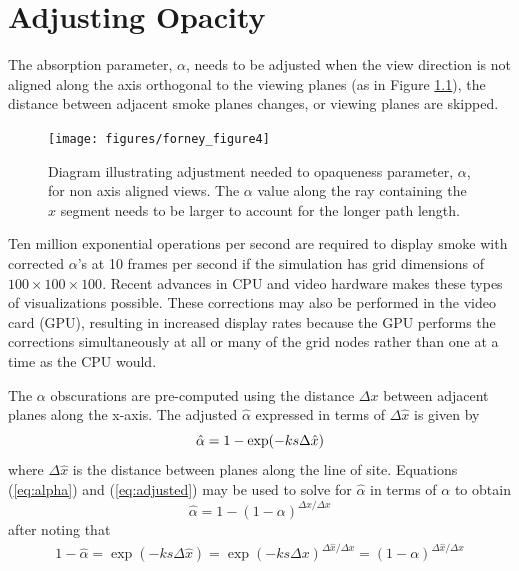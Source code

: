 \documentclass[11pt,twoside]{book}
\begin{document}
%
%

\chapter{Adjusting Opacity}

The absorption parameter, $\alpha$, needs to be adjusted when the
view direction is not aligned along the axis orthogonal to the
viewing planes (as in Figure \ref{figray}), the distance between
adjacent smoke planes changes, or viewing planes are skipped.
\begin{figure}[t]
\centerline{\texttt{[image: figures/forney\_figure4]}}
\caption [Diagram illustrating the adjustment needed to opaqueness
parameter, $\alpha$, for non axis aligned views.] { Diagram
illustrating adjustment needed to opaqueness parameter, $\alpha$,
for non axis aligned views. The $\alpha$ value along the ray
containing the $\hat{x}$ segment needs to be larger to account for
the longer path length. } \label{figray}
\end{figure}

Ten million exponential operations per second are required to
display smoke with corrected $\alpha$'s at 10 frames per second if
the simulation has grid dimensions of $100\times 100\times 100$.
Recent advances in CPU and video hardware makes these types of
visualizations possible. These corrections may also be performed
in the video card (GPU), resulting in increased display rates
because the GPU performs the corrections simultaneously at all or
many of the grid nodes rather than one at a time as the CPU would.

The $\alpha$ obscurations are pre-computed using the distance
$\Delta x$ between adjacent planes along the x-axis. The adjusted
$\hat{\alpha}$ expressed in terms of $\Delta\hat{x}$ is given by
\begin{equation}
\label{eq:adjusted}
\hat{\alpha}=1-\exp(-ks\Delta \hat{x})\\
\end{equation}
where $\Delta\hat{x}$ is the distance between planes along the line of site.
Equations (\ref{eq:alpha}) and (\ref{eq:adjusted}) may be used to
solve for $\hat{\alpha}$ in terms of $\alpha$ to obtain
\begin{equation}
\label{eq:alphahat}
\hat{\alpha}=1-(1-\alpha)^{\Delta\hat{x}/\Delta x}
\end{equation}
after noting that
\begin{eqnarray*}
1-\hat{\alpha}=\exp(-ks\Delta\hat{x})=\exp(-ks\Delta
x)^{\Delta\hat{x}/\Delta x}=(1-\alpha)^{\Delta\hat{x}/\Delta x}
\end{eqnarray*}
\end{document}
